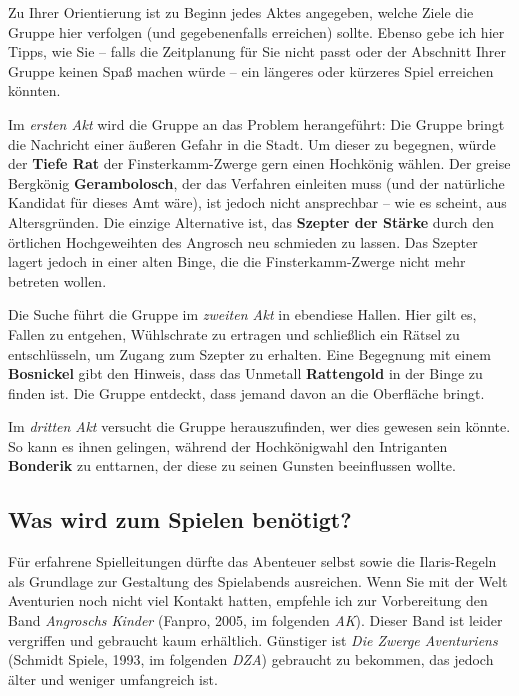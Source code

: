 Zu Ihrer Orientierung ist zu Beginn jedes Aktes angegeben, welche Ziele die Gruppe hier verfolgen (und gegebenenfalls erreichen) sollte.
Ebenso gebe ich hier Tipps, wie Sie -- falls die Zeitplanung für Sie nicht passt  oder der Abschnitt Ihrer Gruppe keinen Spaß machen würde -- ein längeres oder kürzeres Spiel erreichen könnten.

Im \emph{ersten Akt} wird die Gruppe an das Problem herangeführt:
Die Gruppe bringt die Nachricht einer äußeren Gefahr in die Stadt.
Um dieser zu begegnen, würde der \textbf{Tiefe Rat} der Finsterkamm-Zwerge gern einen Hochkönig wählen.
Der greise Bergkönig \textbf{Gerambolosch}, der das Verfahren einleiten muss (und der natürliche Kandidat für dieses Amt wäre), ist jedoch nicht ansprechbar -- wie es scheint, aus Altersgründen.
Die einzige Alternative ist, das \textbf{Szepter der Stärke} durch den örtlichen Hochgeweihten des Angrosch neu schmieden zu lassen.
Das Szepter lagert jedoch in einer alten Binge, die die Finsterkamm-Zwerge nicht mehr betreten wollen.


Die Suche führt die Gruppe im \emph{zweiten Akt} in ebendiese Hallen.
Hier gilt es, Fallen zu entgehen, Wühlschrate zu ertragen und schließlich ein Rätsel zu entschlüsseln, um Zugang zum Szepter zu erhalten.
Eine Begegnung mit einem \textbf{Bosnickel} gibt den Hinweis, dass das Unmetall \textbf{Rattengold} in der Binge zu finden ist.
Die Gruppe entdeckt, dass jemand davon an die Oberfläche bringt.

Im \emph{dritten Akt} versucht die Gruppe herauszufinden, wer dies gewesen sein könnte.
So kann es ihnen gelingen, während der Hochkönigwahl den Intriganten \textbf{Bonderik} zu enttarnen,
der diese zu seinen Gunsten beeinflussen wollte.

\subsection*{Was wird zum Spielen benötigt?}
Für erfahrene Spielleitungen dürfte das Abenteuer selbst sowie die Ilaris-Regeln als Grundlage zur Gestaltung des Spielabends ausreichen.
Wenn Sie mit der Welt Aventurien noch nicht viel Kontakt hatten, empfehle ich zur Vorbereitung den Band \emph{Angroschs Kinder} (Fanpro, 2005, im folgenden \emph{AK}).
Dieser Band ist leider vergriffen und gebraucht kaum erhältlich.
Günstiger ist \emph{Die Zwerge Aventuriens} (Schmidt Spiele, 1993, im folgenden \emph{DZA}) gebraucht zu bekommen,
das jedoch älter und weniger umfangreich ist.

